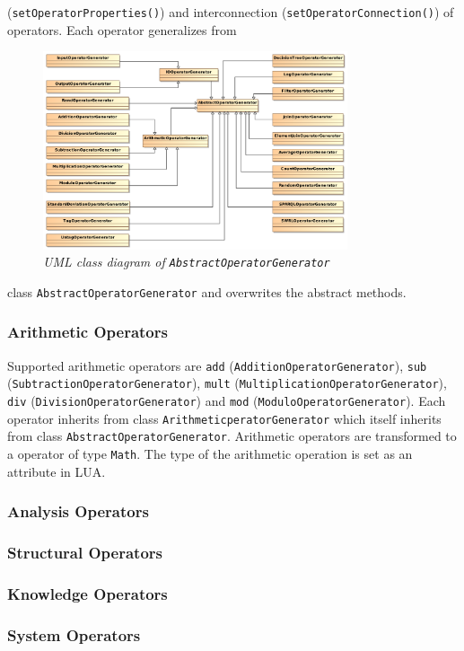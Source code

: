 (\texttt{setOperatorProperties()}) and interconnection 
(\texttt{setOperatorConnection()}) of operators. Each operator generalizes from
\begin{figure}[htpb]
  \centering
  \includegraphics[width=0.8\textwidth]{figures/overview}
  \caption{\emph{UML class diagram of \texttt{AbstractOperatorGenerator}}}
  \label{fig:abstractoperatorgenerator}
\end{figure}
class \texttt{AbstractOperatorGenerator} and overwrites the abstract methods.

\subsubsection{Arithmetic Operators}
Supported arithmetic operators are \texttt{add} 
(\texttt{AdditionOperatorGenerator}), \texttt{sub} 
(\texttt{Subtraction\-OperatorGenerator}), \texttt{mult} 
(\texttt{MultiplicationOperatorGenerator}), \texttt{div} 
(\texttt{DivisionOperator\-Generator}) and \texttt{mod} 
(\texttt{ModuloOperatorGenerator}). Each operator inherits from class 
\texttt{Arithm\-eticperatorGenerator} which itself inherits from class
\texttt{AbstractOperatorGenerator}. Arithmetic operators are transformed to a
operator of type \texttt{Math}. The type of the arithmetic operation is set
as an attribute in LUA.

\subsubsection{Analysis Operators}

\subsubsection{Structural Operators}

\subsubsection{Knowledge Operators}

\subsubsection{System Operators}
